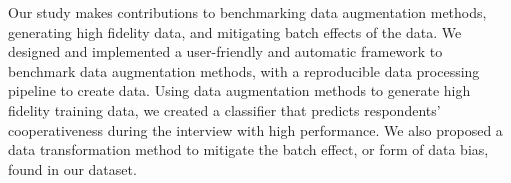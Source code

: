 Our study makes contributions to benchmarking data augmentation methods, generating high fidelity data, and mitigating batch effects of the data. We designed and implemented a user-friendly and automatic framework to benchmark data augmentation methods, with a reproducible data processing pipeline to create data. Using data augmentation methods to generate high fidelity training data, we created a classifier that predicts respondents’ cooperativeness during the interview with high performance. We also proposed a data transformation method to mitigate the batch effect, or form of data bias, found in our dataset. 
\begin{table}[!t]
\caption{Table of size of training data with and without data augmentation methods. The size of testing data (684, 226) is the same regardless of the methods. The size is doubled when the sample-based methods are augmented with GAN.}
\label{tab:table1}
\end{table}